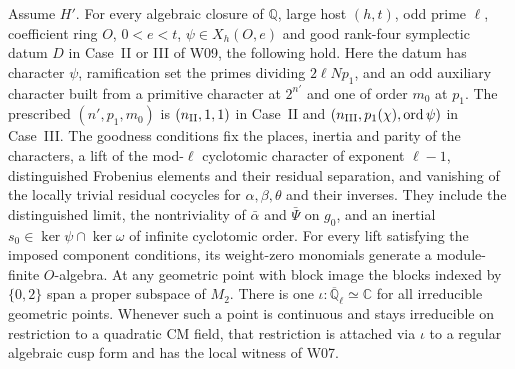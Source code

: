 
\begin{formalstatement}\label{sub:W06}
Assume $H'$. For every algebraic closure of $\mathbb Q$, large host
$(h,t)$, odd prime $\ell$, coefficient ring $O$, $0<e<t$,
$\psi\in X_h(O,e)$ and good rank-four symplectic datum $D$ in 
Case~II or III of W09, the following hold. Here the datum has character
$\psi$, ramification set the primes dividing $2\ell Np_1$, and an odd
auxiliary character built from a primitive character at $2^{n'}$ and
one of order $m_0$ at $p_1$. The prescribed $(n',p_1,m_0)$ is
$(n_{\rm II},1,1)$ in Case~II and
$(n_{\rm III},p_1(\chi),\operatorname{ord}\psi)$ in Case~III.
The goodness conditions fix the places, inertia and parity of the
characters, a lift of the mod-$\ell$ cyclotomic character of exponent
$\ell-1$, distinguished Frobenius elements and their residual
separation, and vanishing of the locally trivial residual cocycles for
$\alpha,\beta,\theta$ and their inverses. They include the distinguished
limit, the nontriviality of $\bar\alpha$ and $\bar\Psi$ on $g_0$, and an
inertial $s_0\in\ker\psi\cap\ker\omega$ of infinite cyclotomic order.
For every lift satisfying
the imposed component conditions, its weight-zero monomials generate a
module-finite $O$-algebra. At any geometric point with block image the
blocks indexed by $\{0,2\}$ span a proper subspace of $M_2$.
There is one $\iota:\overline{\mathbb Q}_\ell\simeq\mathbb C$ for
all irreducible geometric points. Whenever such a point is continuous
and stays irreducible on restriction to a quadratic CM field, that
restriction is attached via $\iota$ to a regular algebraic cusp form
and has the local witness of W07.
\end{formalstatement}
